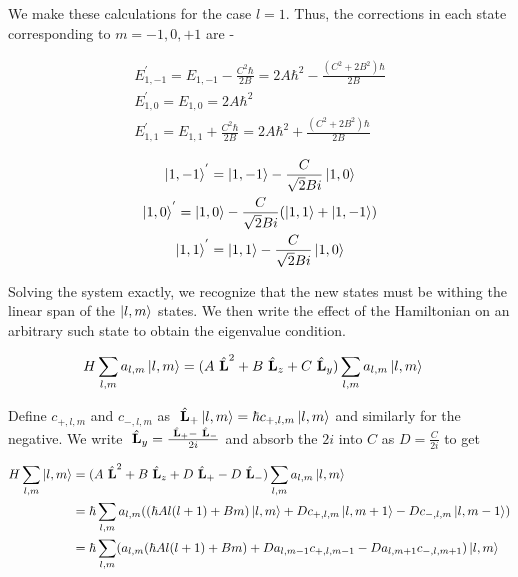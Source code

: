     We make these calculations for the case $l = 1$. Thus, the corrections in each state corresponding to $m = -1, 0, +1$ are -

    \begin{gather*}
        E^{'}_{1,-1} = E_{1,-1} - \frac{C^2\hbar}{2B} = 2A\hbar^2 - \frac{(C^2 + 2B^2)\hbar}{2B}\\
        E^{'}_{1,0} = E_{1,0} = 2A\hbar^2\\
        E^{'}_{1,1} = E_{1,1} + \frac{C^2\hbar}{2B} = 2A\hbar^2 + \frac{(C^2 + 2B^2)\hbar}{2B}
    \end{gather*}

    \begin{gather*}
        \ket{1,-1}^{'} = \ket{1,-1} - \frac{C}{\sqrt{2}Bi}\ket{1,0} \\
        \ket{1,0}^{'} = \ket{1,0} - \frac{C}{\sqrt{2}Bi}(\ket{1,1} + \ket{1,-1})\\
        \ket{1,1}^{'} = \ket{1,1} - \frac{C}{\sqrt{2}Bi}\ket{1,0} 
    \end{gather*}

Solving the system exactly, we recognize that the new states must be withing the
linear span of the $\ket{l, m}$ states. We then write the effect of the
Hamiltonian on an arbitrary such state to obtain the eigenvalue condition.

\begin{align}
    H \sum_{l, m}a_{l, m}\ket{l, m} &= (A ~\hat{\textbf{L}}^2 + B~\hat{\textbf{L}}_z + C~\hat{\textbf{L}}_y) \sum_{l, m}a_{l, m}\ket{l, m}
\end{align}

Define $c_{+, l,m}$ and $c_{-, l,m}$ as $~\hat{\textbf{L}}_+ \ket{l, m} = \hbar c_{+,
l,m} \ket{l, m}$ and similarly for the negative. We write $~\hat{\textbf{L}}_y =
\frac{~\hat{\textbf{L}}_+ - ~\hat{\textbf{L}}_-}{2i}$ and absorb the $2i$ into
$C$ as $D = \frac{C}{2i}$ to get

\begin{align}
    H \sum_{l, m}\ket{l, m} &= 
    (A ~\hat{\textbf{L}}^2 + B~\hat{\textbf{L}}_z + 
    D~\hat{\textbf{L}}_+ - D~\hat{\textbf{L}}_-) \sum_{l, m}a_{l, m}\ket{l, m}\nonumber\\
    &= \hbar \sum_{l, m}a_{l, m}((\hbar A l(l+1) + Bm)\ket{l, m} + Dc_{+, l,m}\ket{l, m+1} - Dc_{-, l,m}\ket{l, m-1}) \nonumber\\
    &= \hbar \sum_{l, m}(a_{l, m}(\hbar A l(l+1) + Bm) + Da_{l, m-1}c_{+, l,m-1} - Da_{l, m+1}c_{-, l,m+1})\ket{l, m} \\
\end{align}

